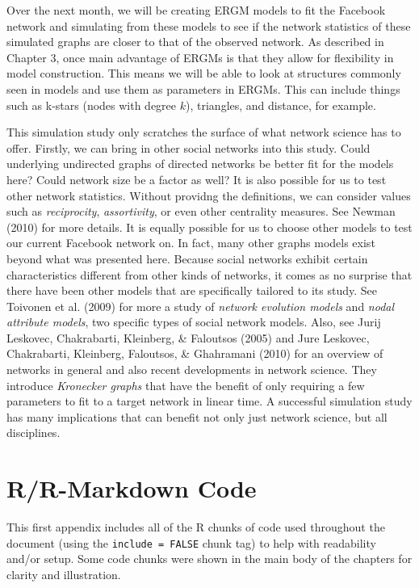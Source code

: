 \documentclass[12pt,twoside]{amherstthesis}
\begin{document}
  Over the next month, we will be creating ERGM models to fit the Facebook
  network and simulating from these models to see if the network
  statistics of these simulated graphs are closer to that of the observed
  network. As described in Chapter 3, once main advantage of ERGMs is that
  they allow for flexibility in model construction. This means we will be
  able to look at structures commonly seen in models and use them as
  parameters in ERGMs. This can include things such as k-stars (nodes with
  degree \(k\)), triangles, and distance, for example.
  
  This simulation study only scratches the surface of what network science
  has to offer. Firstly, we can bring in other social networks into this
  study. Could underlying undirected graphs of directed networks be better
  fit for the models here? Could network size be a factor as well? It is
  also possible for us to test other network statistics. Without providng
  the definitions, we can consider values such as \emph{reciprocity},
  \emph{assortivity}, or even other centrality measures. See Newman (2010)
  for more details. It is equally possible for us to choose other models
  to test our current Facebook network on. In fact, many other graphs
  models exist beyond what was presented here. Because social networks
  exhibit certain characteristics different from other kinds of networks,
  it comes as no surprise that there have been other models that are
  specifically tailored to its study. See Toivonen et al. (2009) for more
  a study of \emph{network evolution models} and \emph{nodal attribute
  models}, two specific types of social network models. Also, see Jurij
  Leskovec, Chakrabarti, Kleinberg, \& Faloutsos (2005) and Jure Leskovec,
  Chakrabarti, Kleinberg, Faloutsos, \& Ghahramani (2010) for an overview
  of networks in general and also recent developments in network science.
  They introduce \emph{Kronecker graphs} that have the benefit of only
  requiring a few parameters to fit to a target network in linear time. A
  successful simulation study has many implications that can benefit not
  only just network science, but all disciplines.
  
  \appendix
  
  \chapter{R/R-Markdown Code}\label{rr-markdown-code}
  
  This first appendix includes all of the R chunks of code used throughout
  the document (using the \texttt{include\ =\ FALSE} chunk tag) to help
  with readability and/or setup. Some code chunks were shown in the main
  body of the chapters for clarity and illustration.
  
\end{document}
